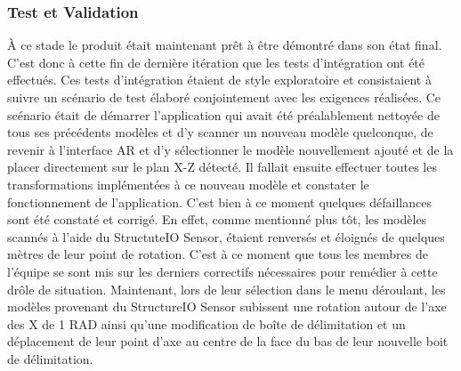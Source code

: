 \documentclass[rapport.tex]{subfiles}
\begin{document}
\subsubsection*{Test et Validation}
À ce stade le produit était maintenant prêt à être démontré dans son état final. C’est donc à cette fin de dernière itération que les tests d’intégration ont été effectués. Ces tests d'intégration étaient de style exploratoire et consistaient à suivre un scénario de test élaboré conjointement avec les exigences réalisées. Ce scénario était de démarrer l’application qui avait été préalablement nettoyée de tous ses précédents modèles et d’y scanner un nouveau modèle quelconque, de revenir à l’interface AR et d’y sélectionner le modèle nouvellement ajouté et de la placer directement sur le plan X-Z détecté. Il fallait ensuite effectuer toutes les transformations implémentées à ce nouveau modèle et constater le fonctionnement de l’application. C’est bien à ce moment quelques défaillances sont été constaté et corrigé. En effet, comme mentionné plus tôt, les modèles scannés à l’aide du StructuteIO Sensor, étaient renversés et éloignés de quelques mètres de leur point de rotation. C’est à ce moment que tous les membres de l’équipe se sont mis sur les derniers correctifs nécessaires pour remédier à cette drôle de situation. Maintenant, lors de leur sélection dans le menu déroulant, les modèles provenant du StructureIO Sensor subissent une rotation autour de l’axe des X de 1 RAD ainsi qu’une modification de boîte de délimitation et un déplacement de leur point d’axe au centre de la face du bas de leur nouvelle boit de délimitation.
\end{document}
